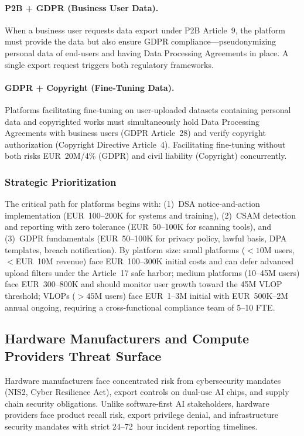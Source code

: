 \documentclass[11pt,a4paper]{article}
\begin{document}
\paragraph{P2B + GDPR (Business User Data).} When a business user requests data export under P2B Article~9, the platform must provide the data but also ensure GDPR compliance---pseudonymizing personal data of end-users and having Data Processing Agreements in place. A single export request triggers both regulatory frameworks.

\paragraph{GDPR + Copyright (Fine-Tuning Data).} Platforms facilitating fine-tuning on user-uploaded datasets containing personal data and copyrighted works must simultaneously hold Data Processing Agreements with business users (GDPR Article~28) and verify copyright authorization (Copyright Directive Article~4). Facilitating fine-tuning without both risks EUR~20M/4\% (GDPR) and civil liability (Copyright) concurrently.

\subsubsection{Strategic Prioritization}

The critical path for platforms begins with: (1)~DSA notice-and-action implementation (EUR~100--200K for systems and training), (2)~CSAM detection and reporting with zero tolerance (EUR~50--100K for scanning tools), and (3)~GDPR fundamentals (EUR~50--100K for privacy policy, lawful basis, DPA templates, breach notification). By platform size: small platforms ($<10$M users, $<$EUR~10M revenue) face EUR~100--300K initial costs and can defer advanced upload filters under the Article~17 safe harbor; medium platforms (10--45M users) face EUR~300--800K and should monitor user growth toward the 45M VLOP threshold; VLOPs ($>45$M users) face EUR~1--3M initial with EUR~500K--2M annual ongoing, requiring a cross-functional compliance team of 5--10 FTE.


\subsection{Hardware Manufacturers and Compute Providers Threat Surface}

Hardware manufacturers face concentrated risk from cybersecurity mandates (NIS2, Cyber Resilience Act), export controls on dual-use AI chips, and supply chain security obligations. Unlike software-first AI stakeholders, hardware providers face product recall risk, export privilege denial, and infrastructure security mandates with strict 24--72~hour incident reporting timelines.
\end{document}
